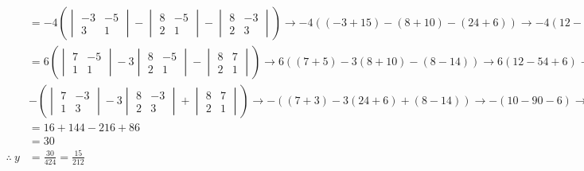 \documentclass[
  letterpaper,
  DIV=11,
  numbers=noendperiod]{scrartcl}
\begin{document}
\begin{align*}
&= -4\left(\begin{vmatrix}-3 & -5 \\ 3 & 1 \end{vmatrix} -\begin{vmatrix}8 & -5 \\ 2 & 1 \end{vmatrix} - \begin{vmatrix} 8 & -3 \\ 2 & 3 \end{vmatrix}\right) \rightarrow -4((-3+15)-(8+10)-(24+6)) \rightarrow -4(12-18-30) \rightarrow 144 \\
&= 6\left(\begin{vmatrix}7 & -5 \\ 1 & 1 \end{vmatrix} -3\begin{vmatrix}8 & -5 \\ 2 & 1 \end{vmatrix} - \begin{vmatrix}8 & 7 \\ 2 & 1 \end{vmatrix}\right) \rightarrow 6((7+5)-3(8+10)-(8-14)) \rightarrow 6(12-54+6) \rightarrow -216 \\
&-\left(\begin{vmatrix}7 & -3 \\ 1 & 3 \end{vmatrix}-3\begin{vmatrix}8 & -3 \\ 2 & 3 \end{vmatrix} + \begin{vmatrix}8 & 7 \\ 2 & 1 \end{vmatrix}\right) \rightarrow -((7+3)-3(24+6)+(8-14)) \rightarrow -(10-90-6) \rightarrow 86 \\
&= 16+144-216+86 \\
&= 30 \\
\therefore \ y &= \frac{30}{424} = \frac{15}{212}
\end{align*}
\end{document}
